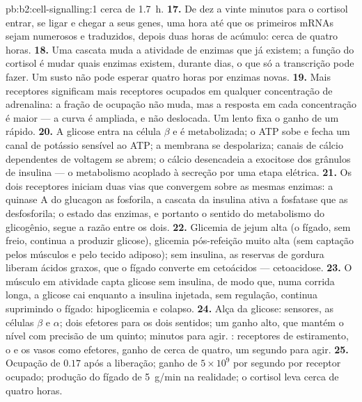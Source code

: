 \begin{solution}{pb:b2:cell-signalling:1}
cerca de \qty{1.7}{h}.
\textbf{17.} De dez a vinte minutos para o cortisol entrar, se ligar e
chegar a seus genes, uma hora até que os primeiros mRNAs sejam numerosos
e traduzidos, depois duas horas de acúmulo: cerca de quatro horas.
\textbf{18.} Uma cascata muda a atividade de enzimas que já existem; a
função do cortisol é mudar quais enzimas existem, durante dias, o que só
a transcrição pode fazer. Um susto não pode esperar quatro horas por
enzimas novas.
\textbf{19.} Mais receptores significam mais receptores ocupados em
qualquer concentração de adrenalina: a fração de ocupação não muda, mas
a resposta em cada concentração é maior --- a curva é ampliada, e não
deslocada. Um  lento fixa o ganho de um rápido.
\textbf{20.} A glicose entra na célula $\beta$ e é metabolizada; o ATP
sobe e fecha um canal de potássio sensível ao ATP; a membrana se
despolariza; canais de cálcio dependentes de voltagem se abrem; o
cálcio desencadeia a exocitose dos grânulos de insulina --- o metabolismo
acoplado à secreção por uma etapa elétrica.
\textbf{21.} Os dois receptores iniciam duas vias que convergem sobre as
mesmas enzimas: a quinase A do glucagon as fosforila, a cascata da
insulina ativa a fosfatase que as desfosforila; o estado das enzimas, e
portanto o sentido do metabolismo do glicogênio, segue a razão entre os
dois.
\textbf{22.} Glicemia de jejum alta (o fígado, sem freio, continua a
produzir glicose), glicemia pós-refeição muito alta (sem captação pelos
músculos e pelo tecido adiposo); sem insulina, as reservas de gordura
liberam ácidos graxos, que o fígado converte em cetoácidos ---
cetoacidose.
\textbf{23.} O músculo em atividade capta glicose sem insulina, de modo
que, numa corrida longa, a glicose cai enquanto a insulina injetada, sem
regulação, continua suprimindo o fígado: hipoglicemia e colapso.
\textbf{24.} Alça da glicose: sensores, as células $\beta$ e $\alpha$;
dois  efetores para os dois sentidos; um ganho alto, que mantém
o nível com precisão de um quinto; minutos para agir. :
receptores de estiramento, o  e os vasos como efetores, ganho de
cerca de quatro, um segundo para agir.
\textbf{25.} Ocupação de $0.17$ após a liberação; ganho de $5\times 10^{9}$ por
segundo por receptor ocupado; produção do fígado de \qty{5}{g/min} na
realidade; o cortisol leva cerca de quatro horas.
\end{solution}
